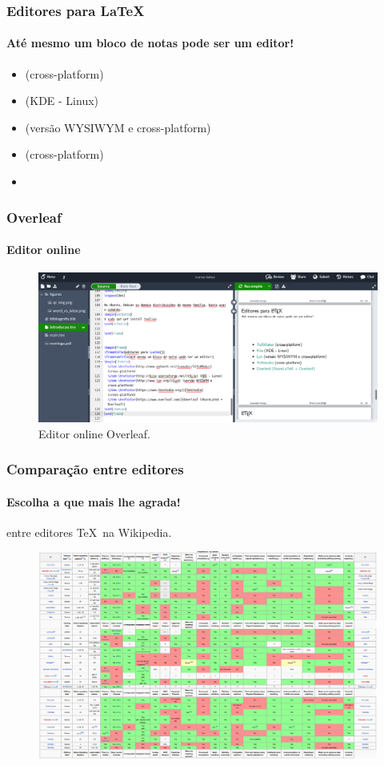 \begin{frame}
\frametitle{Editores para \LaTeX{}}
\framesubtitle{Até mesmo um bloco de notas pode ser um editor!}
\begin{itemize}
  \item {} (cross-platform)
  \item {} (KDE - Linux)
  \item {} (versão WYSIWYM e cross-platform)
  \item {} (cross-platform)
  \item {}
\end{itemize}
\end{frame}


\begin{frame}
\frametitle{Overleaf}
\framesubtitle{Editor online}
\begin{figure}
    \centering
    \includegraphics[width=\textwidth]{figures/overleaf.png}
    \caption{Editor online Overleaf.}
    \label{fig:overleaf}
\end{figure}
\end{frame}


\begin{frame}
\frametitle{Comparação entre editores}
\framesubtitle{Escolha a que mais lhe agrada!}
   entre editores \TeX \ na Wikipedia.

  \begin{figure}[h!]
  \centering
  \includegraphics[width=\textwidth]{figures/editorschart.png}
  \label{fig:editorschart}
  \end{figure}
\end{frame}

